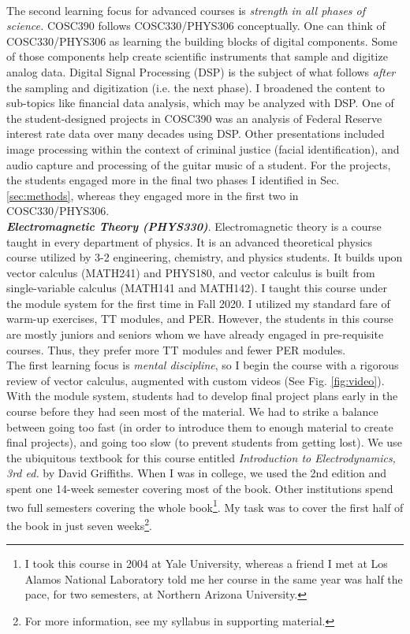 \documentclass[../../../main.tex]{subfiles}
\begin{document}
\\
\vspace{0.25cm}
The second learning focus for advanced courses is \textit{strength in all phases of science.}  COSC390 follows COSC330/PHYS306 conceptually.  One can think of COSC330/PHYS306 as learning the building blocks of digital components.  Some of those components help create scientific instruments that sample and digitize analog data.  Digital Signal Processing (DSP) is the subject of what follows \textit{after} the sampling and digitization (i.e. the next phase).  I broadened the content to sub-topics like financial data analysis, which may be analyzed with DSP.  One of the student-designed projects in COSC390 was an analysis of Federal Reserve interest rate data over many decades using DSP.  Other presentations included image processing within the context of criminal justice (facial identification), and audio capture and processing of the guitar music of a student.  For the projects, the students engaged more in the final two phases I identified in Sec. \ref{sec:methods}, whereas they engaged more in the first two in COSC330/PHYS306.
\\
\vspace{0.25cm}
\textbf{\textit{Electromagnetic Theory (PHYS330)}}.  Electromagnetic theory is a course taught in every department of physics.  It is an advanced theoretical physics course utilized by 3-2 engineering, chemistry, and physics students.  It builds upon vector calculus (MATH241) and PHYS180, and vector calculus is built from single-variable calculus (MATH141 and MATH142).  I taught this course under the module system for the first time in Fall 2020.  I utilized my standard fare of warm-up exercises, TT modules, and PER.  However, the students in this course are mostly juniors and seniors whom we have already engaged in pre-requisite courses.  Thus, they prefer more TT modules and fewer PER modules.
\\
\vspace{0.25cm}
The first learning focus is \textit{mental discipline}, so I begin the course with a rigorous review of vector calculus, augmented with custom videos (See Fig. \ref{fig:video}).  With the module system, students had to develop final project plans early in the course before they had seen most of the material.  We had to strike a balance between going too fast (in order to introduce them to enough material to create final projects), and going too slow (to prevent students from getting lost).  We use the ubiquitous textbook for this course entitled \textit{Introduction to Electrodynamics, 3rd ed.} by David Griffiths.  When I was in college, we used the 2nd edition and spent one 14-week semester covering most of the book.  Other institutions spend two full semesters covering the whole book\footnote{I took this course in 2004 at Yale University, whereas a friend I met at Los Alamos National Laboratory told me her course in the same year was half the pace, for two semesters, at Northern Arizona University.}.  My task was to cover the first half of the book in just seven weeks\footnote{For more information, see my syllabus in supporting material.}.
\end{document}
